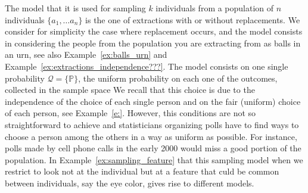 	\begin{example}[ Sampling]
		\label{ex:sampling_model}
		The model that it is used for sampling $k$ individuals from a population of $n$ individuals $\{a_1,\ldots a_n\}$ is the one of extractions with or without replacements. We consider for simplicity the case where replacement occurs, and the model consists in considering the people from the population you are extracting from as balls in an urn, see also Example~\ref{ex:balls_urn} and Example~\ref{ex:extractions_independence???}. The model consists on one single probability $\mathcal Q  = \{ \mathbb P\}$, the uniform probability on each one of the outcomes, collected in the sample space 
	We recall that this choice is due to the independence of the choice of each single person and on the fair (uniform) choice of each person,  see Example~\ref{e:}. However, this conditions are not so straightforward to achieve and statisticians organizing polls have to find ways to choose a person among the others in a way as uniform as possible. For instance, polls made by cell phone calls in the early 2000 would miss a good portion of the population. In Example~\ref{ex:sampling_feature}  that this sampling model when we restrict to look not at the individual but at a feature that culd be common between individuals, say the eye color, gives rise to different models.  
	\end{example}

